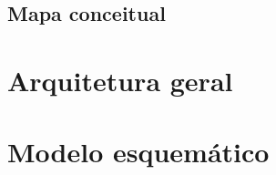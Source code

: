 \subsection{Mapa conceitual}
\label{sec:mapa-conc}
\lipsum[1]



\section{Arquitetura geral}
\label{sec:arq-geral}
\lipsum[1]




\section{Modelo esquemático}
\label{sec:mod-esq}
\lipsum[1]






